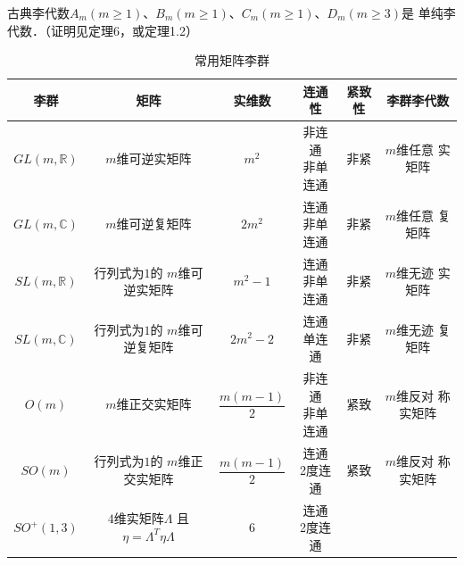 \begin{theorem}\label{chlg:thm_CLA-simple}
	古典李代数$A_m(m\geqslant 1)$、$B_m(m\geqslant 1)$、$C_m(m\geqslant 1)$、$D_m(m\geqslant 3)$是
	单纯李代数．（证明见\parencite[p.148]{huangxg-2024}定理6，或\parencite[\S 1.3]{wanzx-2013}定理1.2）
\end{theorem}


\begin{table}[htb]
    \centering
    \caption{常用矩阵李群} \label{chlg:tab_groups}
    \begin{tabular}{|*6{c|}}
        \hline
        李群 &矩阵 & 实维数 &连通性  & 紧致性 & 李群李代数   \\        \hline
        $GL(m,\mathbb{R})$ & $m$维可逆实矩阵 & $m^2$  & \makecell{非连通\\非单连通 }
        & 非紧 & \makecell{$m$维任意\\ 实矩阵}   \\ \hline
        $GL(m,\mathbb{C})$& $m$维可逆复矩阵 & $2 m^2$ & \makecell{连通 \\非单连通 }
        & 非紧 & \makecell{$m$维任意\\ 复矩阵}  \\ \hline
        $SL(m,\mathbb{R})$ & \makecell{行列式为$1$的\\$m$维可逆实矩阵} & $m^2-1$  &  \makecell{连通 \\ 非单连通 } 
        & 非紧 & \makecell{$m$维无迹\\ 实矩阵}  \\ \hline
        $SL(m,\mathbb{C})$ & \makecell{行列式为$1$的\\$m$维可逆复矩阵} & $2m^2-2$ & \makecell{连通\\单连通 }
        & 非紧 & \makecell{$m$维无迹\\ 复矩阵}  \\ \hline
        $O(m)$  & $m$维正交实矩阵 & $\dfrac{m(m-1)}{2}$  & \makecell{非连通\\非单连通 } 
        & 紧致 & \makecell{$m$维反对\\ 称实矩阵} \\ \hline
        $SO(m)$ & \makecell{行列式为$1$的\\$m$维正交实矩阵} &$\dfrac{m(m-1)}{2}$ & \makecell{连通\\2度连通 }
        & 紧致 & \makecell{$m$维反对\\ 称实矩阵}  \\ \hline
        $SO^{+}(1,3)$ & \makecell{$4$维实矩阵$\Lambda$\\且$\eta=\Lambda^T \eta \Lambda$} & $6$ & \makecell{连通\\2度连通 }

\end{tabular}
\end{table}
